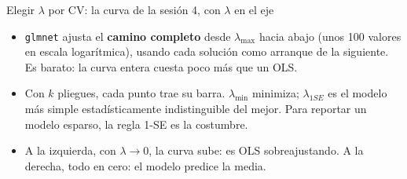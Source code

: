 \documentclass{beamer}
\newcommand{\1}{\mathbb{I}}
\begin{document}
\begin{frame}{Elegir $\lambda$ por CV: la curva de la sesión 4, con $\lambda$ en el eje}
\small
\begin{center}
\end{center}
\pause
\begin{itemize}\itemsep3pt
  \item \texttt{glmnet} ajusta el \textbf{camino completo} desde $\lambda_{\max}$ hacia abajo (unos 100 valores en escala logarítmica), usando cada solución como arranque de la siguiente. Es barato: la curva entera cuesta poco más que un OLS.
  \item Con $k$ pliegues, cada punto trae su barra. $\lambda_{\min}$ minimiza; $\lambda_{1SE}$ es el modelo más simple estadísticamente indistinguible del mejor. Para reportar un modelo esparso, la regla 1-SE es la costumbre.
  \item A la izquierda, con $\lambda \to 0$, la curva sube: es OLS sobreajustando. A la derecha, todo en cero: el modelo predice la media.
\end{itemize}
\end{frame}
\end{document}

